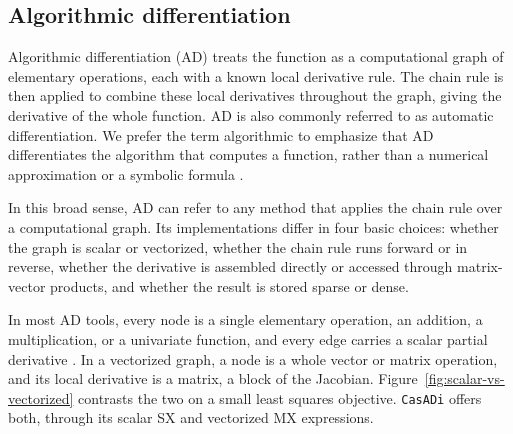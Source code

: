 \subsection{Algorithmic differentiation}\label{sec:bg-ad}
Algorithmic differentiation (AD) treats the function as a computational graph of
elementary operations, each with a known local derivative rule.
The chain rule is then applied to combine these local derivatives throughout the graph, giving the
derivative of the whole function.
AD is also commonly referred to as automatic differentiation.
We prefer the term
algorithmic to emphasize that AD differentiates the algorithm that computes a function,
rather than a numerical approximation or a symbolic formula \cite{griewank2008evaluating}.

In this broad sense, AD can refer to any method that applies the chain rule over a computational
graph.
Its implementations differ in four basic choices: whether the graph is scalar or
vectorized, whether the chain rule runs forward or in reverse, whether the
derivative is assembled directly or accessed through matrix-vector
products, and whether the result is stored sparse or dense.

In most AD tools, every node is a single elementary operation, an addition, a multiplication, or a
univariate function, and every edge carries a scalar partial derivative
\cite{griewank2008evaluating}.
In a vectorized graph, a node is a whole vector or matrix operation, and its local
derivative is a matrix, a block of the Jacobian.
Figure~\ref{fig:scalar-vs-vectorized} contrasts the two on a small least
squares objective.
\texttt{CasADi} \cite{andersson2019} offers both, through its scalar SX and
vectorized MX expressions.


